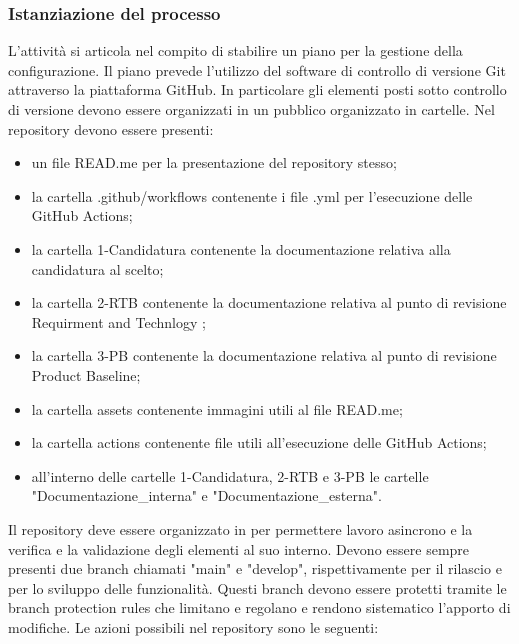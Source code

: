 \subsubsection{Istanziazione del processo}
L'attività si articola nel compito di stabilire un piano per la gestione della configurazione. Il piano prevede l'utilizzo del software di controllo di versione Git attraverso la piattaforma GitHub. In particolare gli elementi posti sotto controllo di versione devono essere organizzati in un  pubblico organizzato in cartelle. Nel repository devono essere presenti: 
\begin{itemize}
    \item un file READ.me per la presentazione del repository stesso;
    \item la cartella .github/workflows contenente i file .yml per l'esecuzione delle GitHub Actions;
    \item la cartella 1-Candidatura contenente la documentazione relativa alla candidatura al  scelto;
    \item la cartella 2-RTB contenente la documentazione relativa al punto di revisione Requirment and Technlogy ;
    \item la cartella 3-PB contenente la documentazione relativa al punto di revisione Product Baseline;
    \item la cartella assets contenente immagini utili al file READ.me;
    \item la cartella actions contenente file utili all'esecuzione delle GitHub Actions;
    \item all'interno delle cartelle 1-Candidatura, 2-RTB e 3-PB le cartelle "Documentazione\_interna" e "Documentazione\_esterna".
\end{itemize}
Il repository deve essere organizzato in  per permettere lavoro asincrono e la verifica e la validazione degli elementi al suo interno. Devono essere sempre presenti due branch chiamati "main" e "develop", rispettivamente per il rilascio e per lo sviluppo delle funzionalità. Questi branch devono essere protetti tramite le branch protection rules che limitano e regolano e rendono sistematico l'apporto di modifiche.
Le azioni possibili nel repository sono le seguenti:
